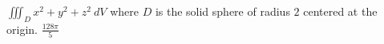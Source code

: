 {$\iiint_D x^2 + y^2 + z^2 \: dV$ where $D$ is the solid sphere of radius $2$ centered at the origin.
}
{$\frac{128\pi}{5}$}